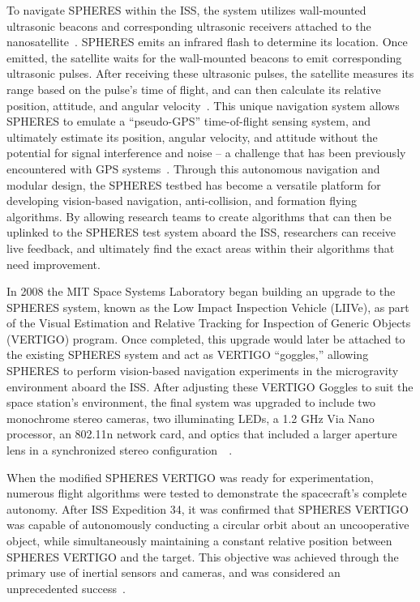 \documentclass[paper=letter, fontsize=11pt]{scrartcl} %
\numberwithin{equation}{section} %
\numberwithin{figure}{section} %
\numberwithin{table}{section} %
\begin{document}
To navigate SPHERES within the ISS, the system utilizes wall-mounted ultrasonic beacons and corresponding ultrasonic receivers attached to the nanosatellite~\cite{SPHERES}. SPHERES emits an infrared flash to determine its location. Once emitted, the satellite waits for the wall-mounted beacons to emit corresponding ultrasonic pulses. After receiving these ultrasonic pulses, the satellite measures its range based on the pulse's time of flight, and can then calculate its relative position, attitude, and angular velocity~\cite{SPHERES,Vertigo1}. This unique navigation system allows SPHERES to emulate a ``pseudo-GPS'' time-of-flight sensing system, and ultimately estimate its position, angular velocity, and attitude without the potential for signal interference and noise -- a challenge that has been previously encountered with GPS systems~\cite{Vertigo1}. Through this autonomous navigation and modular design, the SPHERES testbed has become a versatile platform for developing vision-based navigation, anti-collision, and formation flying algorithms. By allowing research teams to create algorithms that can then be uplinked to the SPHERES test system aboard the ISS, researchers can receive live feedback, and ultimately find the exact areas within their algorithms that need improvement.

In 2008 the MIT Space Systems Laboratory began building an upgrade to the SPHERES system, known as the Low Impact Inspection Vehicle (LIIVe), as part of the Visual Estimation and Relative Tracking for Inspection of Generic Objects (VERTIGO) program. Once completed, this upgrade would later be attached to the existing SPHERES system and act as VERTIGO ``goggles,'' allowing SPHERES to perform vision-based navigation experiments in the microgravity environment aboard the ISS. After adjusting these VERTIGO Goggles to suit the space station's environment, the final system was upgraded to include two monochrome stereo cameras, two illuminating LEDs, a 1.2 GHz Via Nano processor, an 802.11n network card, and optics that included a larger aperture lens in a synchronized stereo configuration~~\cite{SPHERES,Vertigo1,Vertigo2,Vertigo3}.

When the modified SPHERES VERTIGO was ready for experimentation, numerous flight algorithms were tested to demonstrate the spacecraft's complete autonomy. After ISS Expedition 34, it was confirmed that SPHERES VERTIGO was capable of autonomously conducting a circular orbit about an uncooperative object, while simultaneously maintaining a constant relative position between SPHERES VERTIGO and the target. This objective was achieved through the primary use of inertial sensors and cameras, and was considered an unprecedented success~\cite{Vertigo2,Vertigo3}.
\end{document}
